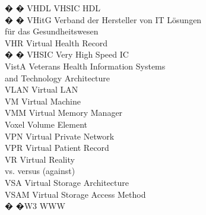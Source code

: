 \begin{tabbing}
� � \>VHDL \>\>VHSIC HDL\\

� � \>VHitG \>\>Verband der Hersteller von IT L\"{o}sungen\\
        \>\>\>f\"{u}r das Gesundheitswesen\\

    \>VHR \>\>Virtual Health Record\\

� � \>VHSIC \>\>Very High Speed IC\\


    \>VistA \>\>Veterans Health Information Systems\\
        \>\>\>and Technology Architecture\\

    \>VLAN \>\>Virtual LAN\\

    \>VM \>\>Virtual Machine\\

    \>VMM \>\>Virtual Memory Manager\\



    \>Voxel \>\>Volume Element\\

    \>VPN \>\>Virtual Private Network\\

    \>VPR \>\>Virtual Patient Record\\

    \>VR \>\>Virtual Reality\\


    \>vs. \>\>versus (against)\\

    \>VSA \>\>Virtual Storage Architecture\\

    \>VSAM \>\>Virtual Storage Access Method\\


 � �\>W3 \>\>WWW\\


\end{tabbing}
